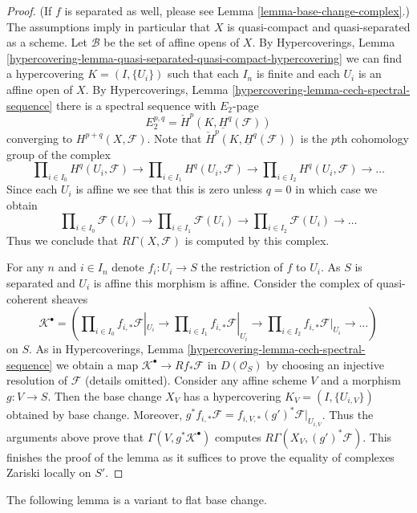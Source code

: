 \documentclass{stacks-project}
\theoremstyle{plain}
\theoremstyle{definition}
\theoremstyle{remark}
\numberwithin{equation}{subsection}
\begin{document}
\begin{proof}
(If $f$ is separated as well, please see
Lemma \ref{lemma-base-change-complex}.)
The assumptions imply in particular that $X$
is quasi-compact and quasi-separated as a scheme.
Let $\mathcal{B}$ be the set of affine opens of $X$. By
Hypercoverings,
Lemma \ref{hypercovering-lemma-quasi-separated-quasi-compact-hypercovering}
we can find a hypercovering $K = (I, \{U_i\})$ such that each
$I_n$ is finite and each $U_i$ is an affine open of $X$. By
Hypercoverings, Lemma \ref{hypercovering-lemma-cech-spectral-sequence}
there is a spectral sequence with $E_2$-page
$$
E_2^{p, q} = \check{H}^p(K, \underline{H}^q(\mathcal{F}))
$$
converging to $H^{p + q}(X, \mathcal{F})$. Note that
$\check{H}^p(K, \underline{H}^q(\mathcal{F}))$ is the $p$th cohomology
group of the complex
$$
\prod\nolimits_{i \in I_0} H^q(U_i, \mathcal{F})
\to
\prod\nolimits_{i \in I_1} H^q(U_i, \mathcal{F})
\to
\prod\nolimits_{i \in I_2} H^q(U_i, \mathcal{F})
\to \ldots
$$
Since each $U_i$ is affine we see that this is zero unless $q = 0$
in which case we obtain
$$
\prod\nolimits_{i \in I_0} \mathcal{F}(U_i)
\to
\prod\nolimits_{i \in I_1} \mathcal{F}(U_i)
\to
\prod\nolimits_{i \in I_2} \mathcal{F}(U_i)
\to \ldots
$$
Thus we conclude that $R\Gamma(X, \mathcal{F})$ is computed by
this complex.

\medskip\noindent
For any $n$ and $i \in I_n$ denote $f_i : U_i \to S$ the restriction of
$f$ to $U_i$. As $S$ is separated and $U_i$ is affine this morphism
is affine. Consider the complex of quasi-coherent sheaves
$$
\mathcal{K}^\bullet = (
\prod\nolimits_{i \in I_0} f_{i, *}\mathcal{F}|_{U_i}
\to
\prod\nolimits_{i \in I_1} f_{i, *}\mathcal{F}|_{U_i}
\to
\prod\nolimits_{i \in I_2} f_{i, *}\mathcal{F}|_{U_i}
\to \ldots )
$$
on $S$. As in
Hypercoverings, Lemma \ref{hypercovering-lemma-cech-spectral-sequence}
we obtain a map $\mathcal{K}^\bullet \to Rf_*\mathcal{F}$ in
$D(\mathcal{O}_S)$ by choosing an injective resolution of $\mathcal{F}$
(details omitted). Consider any affine scheme $V$ and a morphism
$g : V \to S$. Then the base change $X_V$ has a hypercovering
$K_V = (I, \{U_{i, V}\})$ obtained by base change. Moreover,
$g^*f_{i, *}\mathcal{F} = f_{i, V, *}(g')^*\mathcal{F}|_{U_{i, V}}$.
Thus the arguments above prove that $\Gamma(V, g^*\mathcal{K}^\bullet)$
computes $R\Gamma(X_V, (g')^*\mathcal{F})$.
This finishes the proof of the lemma as it suffices to prove
the equality of complexes Zariski locally on $S'$.
\end{proof}

\noindent
The following lemma is a variant to flat base change.
\end{document}
